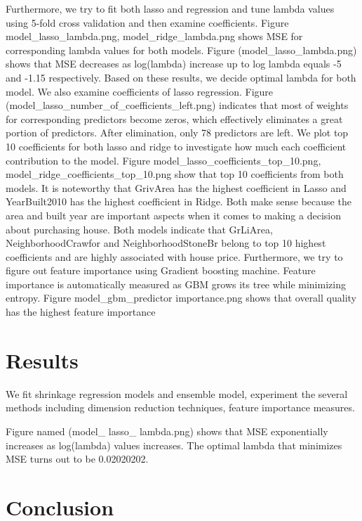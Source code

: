 \documentclass[a4paper]{article}
\begin{document}
\begin{flushleft}
Furthermore, we try to fit both lasso and regression and tune lambda values using 5-fold cross validation and then examine coefficients. Figure model_lasso_lambda.png, model_ridge_lambda.png shows MSE for corresponding lambda values for both models. Figure (model_lasso_lambda.png) shows that MSE decreases as log(lambda) increase up to log lambda equals -5 and  -1.15 respectively. Based on these results, we decide optimal lambda for both model. We also examine coefficients of lasso regression. Figure (model_lasso_number_of_coefficients_left.png) indicates that most of weights for corresponding predictors become zeros, which effectively eliminates a great portion of predictors. After elimination, only 78 predictors are left. We plot top 10 coefficients for both lasso and ridge to investigate how much each coefficient contribution to the model. Figure model_lasso_coefficients_top_10.png, model_ridge_coefficients_top_10.png show that top 10 coefficients from both models. It is noteworthy that GrivArea has the highest coefficient in Lasso and YearBuilt2010 has the highest coefficient in Ridge. Both make sense because the area and built year are important aspects when it comes to making a decision about purchasing house. Both models indicate that GrLiArea, NeighborhoodCrawfor and NeighborhoodStoneBr belong to top 10 highest coefficients and are highly associated with house price. Furthermore, we try to figure out feature importance using Gradient boosting machine. Feature importance is automatically measured as GBM grows its tree while minimizing entropy. Figure model_gbm_predictor importance.png shows that overall quality has the highest feature importance 


\section{Results}

We fit shrinkage regression models and ensemble model, experiment the several methods including dimension reduction techniques, feature importance measures. \newline

Figure named (model\_ lasso\_ lambda.png) shows that MSE exponentially increases as log(lambda) values increases. The optimal lambda that minimizes MSE turns out to be 0.02020202. 


\section{Conclusion}


\end{flushleft}
\end{document}
